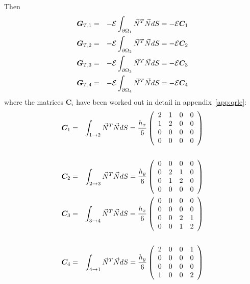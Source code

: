 Then 
\begin{eqnarray}
{\bm G}_{T,1} &=& -{\cal{E}} \int_{\partial\Omega_1} \vec{N}^T \vec{N} dS = -  {\cal{E}} {\bm C}_1 \nonumber\\
{\bm G}_{T,2} &=& -{\cal{E}} \int_{\partial\Omega_2} \vec{N}^T \vec{N} dS = -  {\cal{E}} {\bm C}_2 \nonumber\\
{\bm G}_{T,3} &=& -{\cal{E}} \int_{\partial\Omega_3} \vec{N}^T \vec{N} dS = -  {\cal{E}} {\bm C}_3 \nonumber\\
{\bm G}_{T,4} &=& -{\cal{E}} \int_{\partial\Omega_4} \vec{N}^T \vec{N} dS = -  {\cal{E}} {\bm C}_4 \nonumber
\end{eqnarray}
where the matrices ${\bm C}_i$ have been worked out in detail in appendix~\ref{app:qrle}:
\begin{eqnarray}
{\bm C}_{1} 
&=& \int_{1\rightarrow 2} \vec{N}^T \vec{N} dS  
=
\frac{h_x}{6}
\left(\begin{array}{cccc}
2 & 1 & 0 & 0 \\
1 & 2 & 0 & 0 \\
0 & 0 & 0 & 0 \\
0 & 0 & 0 & 0 
\end{array}\right)
\nonumber\\
\nonumber\\
{\bm C}_{2} 
&=& \int_{2\rightarrow 3} \vec{N}^T \vec{N} dS  
=
\frac{h_y}{6}
\left(\begin{array}{cccc}
0 & 0 & 0 & 0 \\
0 & 2 & 1 & 0 \\
0 & 1 & 2 & 0 \\
0 & 0 & 0 & 0 
\end{array}\right)
\nonumber\\
{\bm C}_{3}
&=& \int_{3\rightarrow 4} \vec{N}^T \vec{N} dS 
=
\frac{h_x}{6}
\left(\begin{array}{cccc}
0 & 0 & 0 & 0 \\
0 & 0 & 0 & 0 \\
0 & 0 & 2 & 1 \\
0 & 0 & 1 & 2 
\end{array}\right)
\nonumber\\
\nonumber\\
{\bm C}_{4} 
&=& \int_{4\rightarrow 1} \vec{N}^T \vec{N} dS  
=
\frac{h_y}{6}
\left(\begin{array}{cccc}
2 & 0 & 0 & 1 \\
0 & 0 & 0 & 0 \\
0 & 0 & 0 & 0 \\
1& 0 & 0 & 2 
\end{array}\right)
\nonumber
\end{eqnarray}

